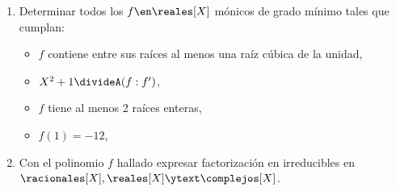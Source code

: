 \begin{enunciado}{\ejExtra}
  \begin{enumerate}[label=\alph*)]
    \item
          Determinar todos los $f \en \reales[X]$ mónicos de grado mínimo tales que cumplan:
          \begin{itemize}
            \item $f$ contiene entre sus raíces al menos una raíz cúbica de la unidad,
            \item $X^2 + 1 \divideA (f:f')$,
            \item $f$ tiene al menos 2 raíces enteras,
            \item $f(1) = -12$,
          \end{itemize}

    \item Con el polinomio $f$ hallado expresar factorización en irreducibles en $\racionales[X], \reales[X] \ytext \complejos[X]$.
  \end{enumerate}
\end{enunciado}

